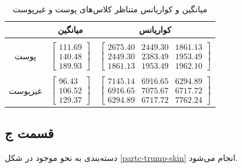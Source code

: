 \documentclass{article}
\begin{document}
\begin{table}[h]
    \centering
    \caption{میانگین و کواریانس متناظر کلاس‌های پوست و غیر‌پوست}
    \label{skin-non-skin-mean-covariance}
    \begin{tabular}{c|c|c}
        & میانگین & کواریانس \\
        \hline
        & & \\
        پوست & $\begin{bmatrix} 111.69\\ 140.48\\ 189.93 \end{bmatrix}$ & $\begin{bmatrix} 2675.40 & 2449.30 & 1861.13 \\ 2449.30 & 2383.49 & 1953.49 \\ 1861.13 & 1953.49 & 1962.10 \end{bmatrix}$ \\
        & & \\
        غیرپوست & $\begin{bmatrix}96.43 \\ 106.52 \\ 129.37 \end{bmatrix}$ & $\begin{bmatrix}7145.14 & 6916.65 & 6294.89 \\ 6916.65 & 7075.67 & 6717.72 \\ 6294.89 & 6717.72 & 7762.24 \end{bmatrix}$
    \end{tabular}
\end{table}

\subsection*{قسمت ج}

دسته‌بندی به نحو موجود در شکل \ref{partc-trump-skin} انجام می‌شود.
\end{document}
